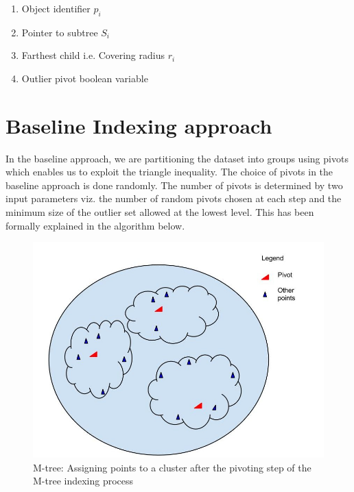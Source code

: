 \begin{enumerate}
	\item Object identifier $p_i$
	\item Pointer to subtree $S_i$
	\item Farthest child i.e. Covering radius $r_i$
	\item Outlier pivot boolean variable
\end{enumerate}

\section{Baseline Indexing approach}
In the baseline approach, we are partitioning the dataset into groups using pivots which enables us to exploit the triangle inequality. The choice of pivots in the baseline approach is done randomly. The number of pivots is determined by two input parameters viz. the number of random pivots chosen at each step and the minimum size of the outlier set allowed at the lowest level. This has been formally explained in the algorithm below. \\

\begin{figure}[ht]	
\centering
\includegraphics[width=0.7 \columnwidth]{img/image0a.jpg}
\caption{M-tree: Assigning points to a cluster after the pivoting step of the M-tree indexing process}
\label{fig:4.1}
\end{figure}

